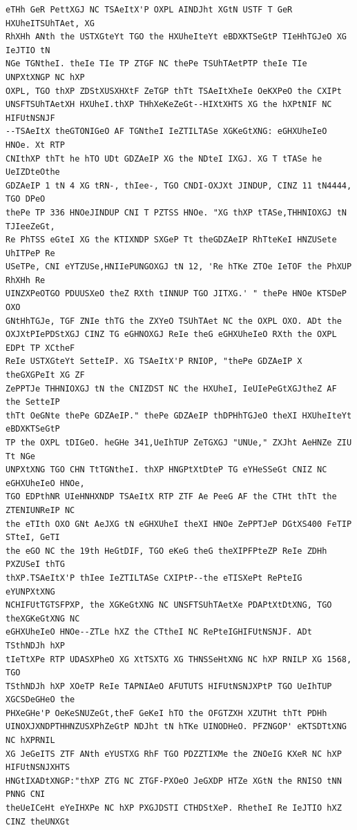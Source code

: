 \documentclass[12pt,a4paper]{article}
\begin{document}
\begin{lstlisting}[caption={Complete text after iteration 2}, label={lst:iter2}]
eTHh GeR PettXGJ NC TSAeItX'P OXPL AINDJht XGtN USTF T GeR HXUheITSUhTAet, XG
RhXHh ANth the USTXGteYt TGO the HXUheIteYt eBDXKTSeGtP TIeHhTGJeO XG IeJTIO tN
NGe TGNtheI. theIe TIe TP ZTGF NC thePe TSUhTAetPTP theIe TIe UNPXtXNGP NC hXP
OXPL, TGO thXP ZDStXUSXHXtF ZeTGP thTt TSAeItXheIe OeKXPeO the CXIPt
UNSFTSUhTAetXH HXUheI.thXP THhXeKeZeGt--HIXtXHTS XG the hXPtNIF NC HIFUtNSNJF
--TSAeItX theGTONIGeO AF TGNtheI IeZTILTASe XGKeGtXNG: eGHXUheIeO HNOe. Xt RTP
CNIthXP thTt he hTO UDt GDZAeIP XG the NDteI IXGJ. XG T tTASe he UeIZDteOthe
GDZAeIP 1 tN 4 XG tRN-, thIee-, TGO CNDI-OXJXt JINDUP, CINZ 11 tN4444, TGO DPeO
thePe TP 336 HNOeJINDUP CNI T PZTSS HNOe. "XG thXP tTASe,THHNIOXGJ tN TJIeeZeGt,
Re PhTSS eGteI XG the KTIXNDP SXGeP Tt theGDZAeIP RhTteKeI HNZUSete UhITPeP Re
USeTPe, CNI eYTZUSe,HNIIePUNGOXGJ tN 12, 'Re hTKe ZTOe IeTOF the PhXUP RhXHh Re
UINZXPeOTGO PDUUSXeO theZ RXth tINNUP TGO JITXG.' " thePe HNOe KTSDeP OXO
GNtHhTGJe, TGF ZNIe thTG the ZXYeO TSUhTAet NC the OXPL OXO. ADt the
OXJXtPIePDStXGJ CINZ TG eGHNOXGJ ReIe theG eGHXUheIeO RXth the OXPL EDPt TP XCtheF
ReIe USTXGteYt SetteIP. XG TSAeItX'P RNIOP, "thePe GDZAeIP X theGXGPeIt XG ZF
ZePPTJe THHNIOXGJ tN the CNIZDST NC the HXUheI, IeUIePeGtXGJtheZ AF the SetteIP
thTt OeGNte thePe GDZAeIP." thePe GDZAeIP thDPHhTGJeO theXI HXUheIteYt eBDXKTSeGtP
TP the OXPL tDIGeO. heGHe 341,UeIhTUP ZeTGXGJ "UNUe," ZXJht AeHNZe ZIU Tt NGe
UNPXtXNG TGO CHN TtTGNtheI. thXP HNGPtXtDteP TG eYHeSSeGt CNIZ NC eGHXUheIeO HNOe,
TGO EDPthNR UIeHNHXNDP TSAeItX RTP ZTF Ae PeeG AF the CTHt thTt the ZTENIUNReIP NC
the eTIth OXO GNt AeJXG tN eGHXUheI theXI HNOe ZePPTJeP DGtXS400 FeTIP STteI, GeTI
the eGO NC the 19th HeGtDIF, TGO eKeG theG theXIPFPteZP ReIe ZDHh PXZUSeI thTG
thXP.TSAeItX'P thIee IeZTILTASe CXIPtP--the eTISXePt RePteIG eYUNPXtXNG
NCHIFUtTGTSFPXP, the XGKeGtXNG NC UNSFTSUhTAetXe PDAPtXtDtXNG, TGO theXGKeGtXNG NC
eGHXUheIeO HNOe--ZTLe hXZ the CTtheI NC RePteIGHIFUtNSNJF. ADt TSthNDJh hXP
tIeTtXPe RTP UDASXPheO XG XtTSXTG XG THNSSeHtXNG NC hXP RNILP XG 1568, TGO
TSthNDJh hXP XOeTP ReIe TAPNIAeO AFUTUTS HIFUtNSNJXPtP TGO UeIhTUP XGCSDeGHeO the
PHXeGHe'P OeKeSNUZeGt,theF GeKeI hTO the OFGTZXH XZUTHt thTt PDHh
UINOXJXNDPTHHNZUSXPhZeGtP NDJht tN hTKe UINODHeO. PFZNGOP' eKTSDTtXNG NC hXPRNIL
XG JeGeITS ZTF ANth eYUSTXG RhF TGO PDZZTIXMe the ZNOeIG KXeR NC hXP HIFUtNSNJXHTS
HNGtIXADtXNGP:"thXP ZTG NC ZTGF-PXOeO JeGXDP HTZe XGtN the RNISO tNN PNNG CNI
theUeICeHt eYeIHXPe NC hXP PXGJDSTI CTHDStXeP. RhetheI Re IeJTIO hXZ CINZ theUNXGt

\end{lstlisting}
\end{document}
